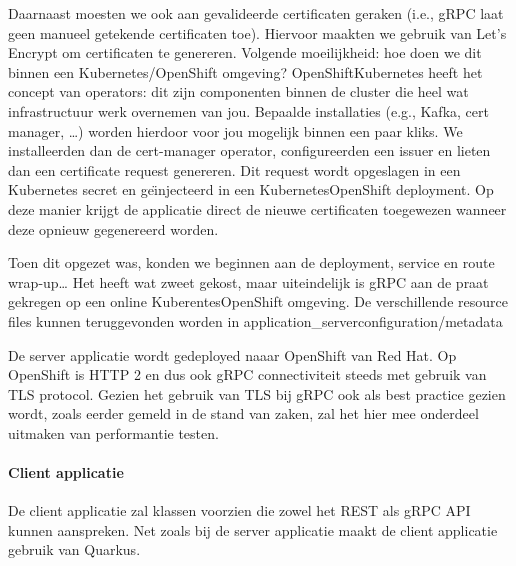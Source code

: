 Daarnaast moesten we ook aan gevalideerde certificaten geraken (i.e., gRPC laat geen manueel getekende certificaten toe). Hiervoor maakten we
gebruik van Let's Encrypt om certificaten te genereren. Volgende moeilijkheid: hoe doen we dit binnen een Kubernetes/OpenShift omgeving?
OpenShift\/Kubernetes heeft het concept van operators: dit zijn componenten binnen de cluster die heel wat infrastructuur werk overnemen van jou.
Bepaalde installaties (e.g., Kafka, cert manager, \ldots) worden hierdoor voor jou mogelijk binnen een paar kliks. We installeerden dan de
cert-manager operator, configureerden een issuer en lieten dan een certificate request genereren. Dit request wordt opgeslagen in een Kubernetes
secret en ge\"{\i}njecteerd in een Kubernetes\/OpenShift deployment. Op deze manier krijgt de applicatie direct de nieuwe certificaten toegewezen
wanneer deze opnieuw gegenereerd worden.

Toen dit opgezet was, konden we beginnen aan de deployment, service en route wrap-up\ldots
Het heeft wat zweet gekost, maar uiteindelijk is gRPC aan de praat gekregen op een online Kuberentes\/OpenShift omgeving.
De verschillende resource files kunnen teruggevonden worden in application\_server\/configuration/metadata

De server applicatie wordt gedeployed naaar OpenShift van Red Hat. Op OpenShift is HTTP 2 en dus ook gRPC connectiviteit steeds met gebruik van TLS protocol.
Gezien het gebruik van TLS bij gRPC ook als best practice gezien wordt, zoals eerder gemeld in de stand van zaken, zal het hier mee onderdeel uitmaken van performantie testen.\newline
~\autocite{openshifttls}

\paragraph{Client applicatie}

De client applicatie zal klassen voorzien die zowel het REST als gRPC API kunnen aanspreken.
Net zoals bij de server applicatie maakt de client applicatie gebruik van Quarkus.\\

